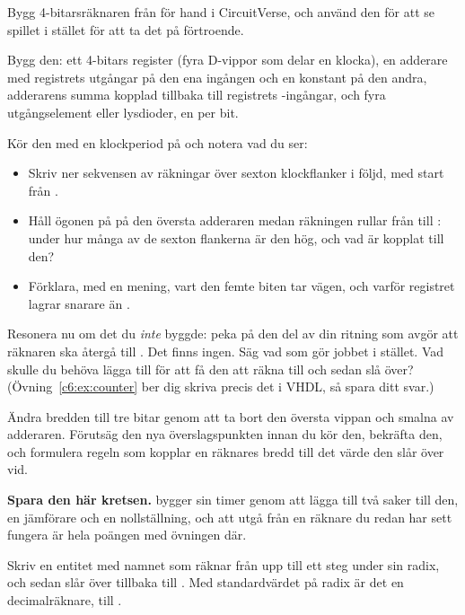 \label{c6:ex:counterhand}
Bygg 4-bitarsräknaren från  för hand i CircuitVerse, och använd den för att
se spillet i stället för att ta det på förtroende.

 Bygg den: ett 4-bitars register (fyra D-vippor som delar en klocka), en adderare med
registrets utgångar på den ena ingången och en konstant  på den andra, adderarens summa
kopplad tillbaka till registrets -ingångar, och fyra utgångselement eller lysdioder, en per
bit.

 Kör den med en klockperiod på  och notera vad du ser:
\begin{itemize}
  \item Skriv ner sekvensen av räkningar över sexton klockflanker i följd, med start från
    .
  \item Håll ögonen på  på den översta adderaren medan räkningen rullar från
     till : under hur många av de sexton flankerna är den hög, och vad är
    kopplat till den?
  \item Förklara, med en mening, vart den femte biten tar vägen, och varför registret lagrar
     snarare än .
\end{itemize}

 Resonera nu om det du \emph{inte} byggde: peka på den del av din ritning som avgör att
räknaren ska återgå till . Det finns ingen. Säg vad som gör jobbet i stället. Vad skulle
du behöva lägga till för att få den att räkna  till  och sedan slå över?
(Övning~\ref{c6:ex:counter} ber dig skriva precis det i VHDL, så spara ditt svar.)

 Ändra bredden till tre bitar genom att ta bort den översta vippan och smalna av
adderaren. Förutsäg den nya överslagspunkten innan du kör den, bekräfta den, och formulera regeln
som kopplar en räknares bredd till det värde den slår över vid.

\textbf{Spara den här kretsen.}  bygger sin timer genom att lägga till två saker till
den, en jämförare och en nollställning, och att utgå från en räknare du redan har sett fungera är
hela poängen med övningen där.

\label{c6:ex:counter}
Skriv en entitet med namnet  som räknar från  upp till ett steg under sin
radix, och sedan slår över tillbaka till . Med standardvärdet på radix är det en
decimalräknare,  till .

